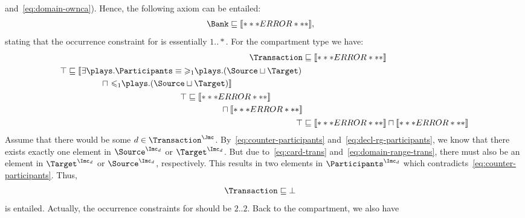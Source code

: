\begin{example}
  and~\eqref{eq:domain-ownca}). Hence, the following axiom can be entailed:
\begin{align}
  \Bank & \sqsubseteq \oax{(\atleast{1}{\counts}{\Customer})(\occurCounter)},\label{eq:counter-customer}
\end{align}
stating that the occurrence constraint for \Customer is essentially $1..*$. For the
\Transaction compartment type we have:
\begin{align}
  \Transaction & \sqsubseteq \oax{(\atleast{1}{\counts}{\Participants} \sqcap
                 \atmost{1}{\counts}{\Participants})(\occurCounter)}\label{eq:counter-participants}\\
  \begin{split}
    \top & \sqsubseteq\oaxl{\exists\plays.\Participants \equiv
      \atleast{1}{\plays}{(\Source\sqcup\Target)}}\\
    & \qquad\qquad \sqcap \oaxr{\atmost{1}{\plays}{(\Source\sqcup\Target)}}
  \end{split}\label{eq:decl-rg-participants}\\
  \begin{split}
    \top & \sqsubseteq \oax{\Source \sqsubseteq \atleast{1}{\transBank}{\top} \sqcap
      \atmost{1}{\transBank}{\top}}\\
    & \qquad\qquad \sqcap \oax{\Target \sqsubseteq \atleast{1}{\transBank^{-}}{\top} \sqcap
      \atmost{1}{\transBank^{-}}{\top}} 
  \end{split}\label{eq:card-trans}\\
   \top & \sqsubseteq \oax{\exists\transBank.\top\sqsubseteq\Source} \sqcap \oax{\exists\transBank^{-}.\top\sqsubseteq\Target}\label{eq:domain-range-trans}
\end{align}
Assume that there would be some $d\in\Transaction^{\J}$.  By~\eqref{eq:counter-participants}
and~\eqref{eq:decl-rg-participants}, we know that there exists exactly one element in
$\Source^{\I_{d}}$ or $\Target^{\I_{d}}$. But due to~\eqref{eq:card-trans}
and~\eqref{eq:domain-range-trans}, there must also be an element in $\Target^{\I_{d}}$ or
$\Source^{\I_{d}}$, respectively. This results in two elements in $\Participants^{\I_{d}}$ which
contradicts~\eqref{eq:counter-participants}. Thus,
\begin{align}
  \Transaction & \sqsubseteq \bot\label{eq:transaction-bottom}
\end{align}
is entailed. Actually, the occurrence constraints for \Participants should be $2..2$.  Back to the
\Bank compartment, we also have
\begin{align}

\end{align}
\end{example}
